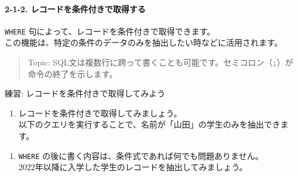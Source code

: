 \paragraph{2-1-2.
レコードを条件付きで取得する}\label{ux30ecux30b3ux30fcux30c9ux3092ux6761ux4ef6ux4ed8ux304dux3067ux53d6ux5f97ux3059ux308b}

\texttt{WHERE} 句によって、レコードを条件付きで取得できます。\\
この機能は、特定の条件のデータのみを抽出したい時などに活用されます。

\begin{quote}
Topic:
SQL文は複数行に跨って書くことも可能です。セミコロン（\texttt{;}）が命令の終了を示します。
\end{quote}

練習: レコードを条件付きで取得してみよう

\begin{enumerate}
\def\labelenumi{\arabic{enumi}.}
\tightlist
\item
  レコードを条件付きで取得してみましょう。\\
  以下のクエリを実行することで、名前が「山田」の学生のみを抽出できます。
\end{enumerate}

\begin{Shaded}
\begin{Highlighting}[]
 \OperatorTok{*} \OperatorTok{=} \NormalTok{;}
\end{Highlighting}
\end{Shaded}

\begin{enumerate}
\def\labelenumi{\arabic{enumi}.}
\setcounter{enumi}{1}
\tightlist
\item
  \texttt{WHERE}
  の後に書く内容は、条件式であれば何でも問題ありません。\\
  2022年以降に入学した学生のレコードを抽出してみましょう。
\end{enumerate}

\begin{Shaded}
\begin{Highlighting}[]
 \OperatorTok{*} \OperatorTok{\textgreater{}=} \NormalTok{;}
\end{Highlighting}
\end{Shaded}

